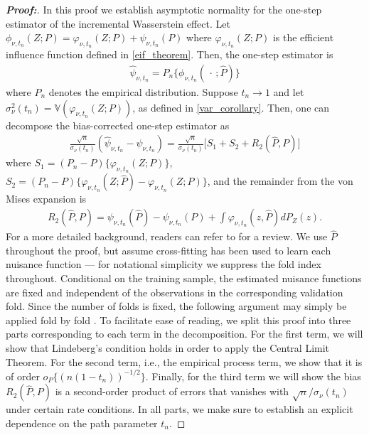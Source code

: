 \documentclass[11pt,twoside]{article}
\theoremstyle{definition}
\theoremstyle{remark}
\begin{document}
\begin{proof}[\textbf{Proof:}] In this proof we establish asymptotic normality for the one-step estimator of the incremental Wasserstein effect. Let $\phi_{\nu, t_n}(Z; P) = \varphi_{\nu, t_n}(Z; P) + \psi_{\nu, t_n}(P)$ where $\varphi_{\nu, t_n}(Z; P)$ is the efficient influence function defined in \cref{eif_theorem}. Then, the one-step estimator is
\begin{align*}
    \widehat{\psi}_{\nu, t_n} = P_n \{\phi_{\nu, t_n}(\, \cdot \, ; \widehat{P}) \}
\end{align*}
where $P_n$ denotes the empirical distribution. Suppose $t_n \to 1$ and let $\sigma^2_{\nu}(t_n) = \mathbb{V}(\varphi_{\nu, t_n}(Z; P))$, as defined in \cref{var_corollary}. Then, one can decompose the bias-corrected one-step estimator as
\begin{align*}
    \frac{\sqrt{n}}{\sigma_{\nu}(t_n)} \left(\widehat{\psi}_{\nu, t_n}- \psi_{\nu, t_n} \right) = \frac{\sqrt{n}}{\sigma_{\nu}(t_n)} \Big[ S_1 + S_2 + R_2(\widehat{P}, P) \Big]
\end{align*}
where $S_1 = (P_n - P) \{\varphi_{\nu, t_n}(Z; P) \}$, $S_2 = (P_n - P) \{ \varphi_{\nu, t_n}(Z; \widehat{P}) - \varphi_{\nu, t_n}(Z; P) \}$, and the remainder from the von Mises expansion is 
\begin{align*}
    R_2(\widehat{P}, P) = \psi_{\nu, t_n}(\widehat{P}) - \psi_{\nu, t_n}(P) + \int \varphi_{\nu, t_n}(z, \widehat{P}) dP_Z(z).
\end{align*}
For a more detailed background, readers can refer to \cite{kennedy2024semiparametric} for a review. We use $\widehat{P}$ throughout the proof, but assume cross-fitting has been used to learn each nuisance function --- for notational simplicity we suppress the fold index throughout. Conditional on the training sample, the estimated nuisance functions are fixed and independent of the observations in the corresponding validation fold. Since the number of folds is fixed, the following argument may simply be applied fold by fold \citep{Chernozhukov2018}. To facilitate ease of reading, we split this proof into three parts corresponding to each term in the decomposition. For the first term, we will show that Lindeberg's condition holds in order to apply the Central Limit Theorem. For the second term, i.e., the empirical process term, we show that it is of order $o_P\{(n(1-t_n))^{-1/2}\}$. Finally, for the third term we will show the bias $R_2(\widehat{P}, P)$ is a second-order product of errors that vanishes with $\sqrt{n} / \sigma_\nu(t_n)$ under certain rate conditions. In all parts, we make sure to establish an explicit dependence on the path parameter $t_n$. \bigskip



\end{proof}
\end{document}
